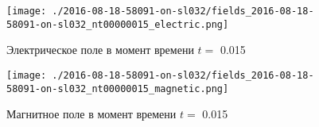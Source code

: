 \documentclass[a4paper,14pt]{extreport}
\begin{document}
\begin{center}
\begin{figure}[!hbt]
\texttt{[image: ./2016-08-18-58091-on-sl032/fields\_2016-08-18-58091-on-sl032\_nt00000015\_electric.png]}
\caption{\label{electric_15_62} Электрическое поле  в момент времени $t = $ 0.015 }
\end{figure}
\end{center}
\begin{center}
\begin{figure}[!hbt]
\texttt{[image: ./2016-08-18-58091-on-sl032/fields\_2016-08-18-58091-on-sl032\_nt00000015\_magnetic.png]}
\caption{\label{magnetic_15_63} Магнитное поле  в момент времени $t = $ 0.015 }
\end{figure}
\end{center}
\end{document}

